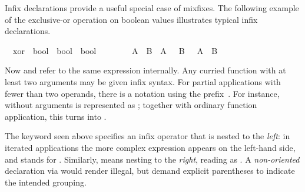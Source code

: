 \begin{isabellebody}
\begin{isamarkuptext}
  Infix declarations provide a useful special
  case of mixfixes.  The following example of the exclusive-or
  operation on boolean values illustrates typical infix declarations.%
\end{isamarkuptext}%
\isamarkuptrue%
\isanewline
\ \ xor\ {\isacharcolon}{\isacharcolon}\ {\isachardoublequote}bool\ {\isasymRightarrow}\ bool\ {\isasymRightarrow}\ bool{\isachardoublequote}\ \ \ \ {\isacharparenleft}\ {\isachardoublequote}{\isacharbrackleft}{\isacharplus}{\isacharbrackright}{\isachardoublequote}\ {}{}{\isacharparenright}\isanewline
\ \ {\isachardoublequote}A\ {\isacharbrackleft}{\isacharplus}{\isacharbrackright}\ B\ {\isasymequiv}\ {\isacharparenleft}A\ {\isasymand}\ {\isasymnot}\ B{\isacharparenright}\ {\isasymor}\ {\isacharparenleft}{\isasymnot}\ A\ {\isasymand}\ B{\isacharparenright}{\isachardoublequote}\isamarkupfalse%
%
\begin{isamarkuptext}%
\noindent Now  and  refer to the
  same expression internally.  Any curried function with at least two
  arguments may be given infix syntax.  For partial applications with
  fewer than two operands, there is a notation using the prefix~.  For instance,  without arguments is represented as
  ; together with ordinary function application, this
  turns  into .

  \medskip The keyword  seen above specifies an
  infix operator that is nested to the \emph{left}: in iterated
  applications the more complex expression appears on the left-hand
  side, and  stands for .  Similarly,  means nesting to the
  \emph{right}, reading  as .  A \emph{non-oriented} declaration via 
  would render  illegal, but demand explicit
  parentheses to indicate the intended grouping.


\end{isamarkuptext}
\end{isabellebody}
